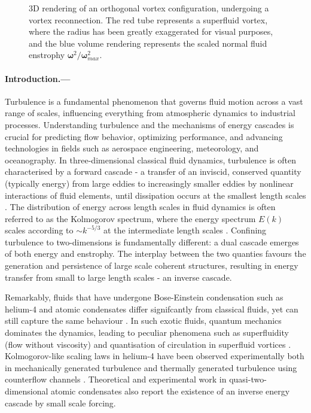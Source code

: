 \documentclass[%
 reprint,
 amsmath,amssymb,
 aps,
 prl,
]{revtex4-2}
\newcommand{\bom}{\boldsymbol{\omega}}
\begin{document}
\begin{figure}
\begin{subfigure}[b]{0.24\textwidth}
	\end{subfigure}
    \hfill
	\caption{3D rendering of an orthogonal vortex configuration, undergoing a vortex reconnection. The red tube represents a superfluid vortex, where the radius has been greatly exaggerated for visual purposes, and the blue volume rendering represents the scaled normal fluid enstrophy $\bom^2/\bom^2_{max}$.}
    \label{fig:visualisation}
\end{figure}

\paragraph*{Introduction.---} Turbulence is a fundamental phenomenon that governs fluid motion across a vast range of scales, influencing everything from atmospheric dynamics to industrial processes. Understanding turbulence and the mechanisms of energy cascades is crucial for predicting flow behavior, optimizing performance, and advancing technologies in fields such as aerospace engineering, meteorology, and oceanography. In three-dimensional classical fluid dynamics, turbulence is often characterised by a forward cascade - a transfer of an inviscid, conserved quantity (typically energy) from large eddies to increasingly smaller eddies by nonlinear interactions of fluid elements, until dissipation occurs at the smallest length scales \cite{richardson1922weather}. The distribution of energy across length scales in fluid dynamics is often referred to as the Kolmogorov spectrum, where the energy spectrum $E(k)$ scales according to $\sim k^{-5/3}$ at the intermediate length scales \cite{frisch1995}. Confining turbulence to two-dimensions is fundamentally different: a dual cascade emerges of both energy and enstrophy. The interplay between the two quanties favours the generation and persistence of large scale coherent structures, resulting in energy transfer from small to large length scales - an inverse cascade. 

Remarkably, fluids that have undergone Bose-Einstein condensation such as helium-4 and atomic condensates differ signifcantly from classical fluids, yet can still capture the same behaviour \cite{maurer1998,baggaley2012,sherwin-robson2015}. In such exotic fluids, quantum mechanics dominates the dynamics, leading to peculiar phenomena such as superfluidity (flow without viscosity) and quantisation of circulation in superfluid vortices \cite{barenghi2009vortices}. Kolmogorov-like scaling laws in helium-4 have been observed experimentally both in mechanically generated turbulence \cite{salort2010turbulent} and thermally generated turbulence using counterflow channels \cite{gao2017energy}. Theoretical \cite{bradley2012energy,reeves2013,simula2014emergence} and experimental \cite{johnstone2019evolution,gauthier2019giant} work in quasi-two-dimensional atomic condensates also report the existence of an inverse energy cascade by small scale forcing.
\end{document}
